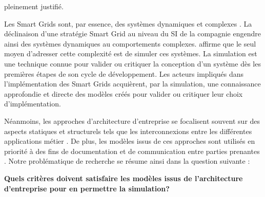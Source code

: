 pleinement justifié.

Les Smart Grids sont, par essence, des systèmes  dynamiques et complexes 
\cite{monti_power_2010}. La déclinaison d'une stratégie Smart Grid au niveau du 
SI de la compagnie engendre ainsi des systèmes dynamiques au comportements 
complexes. \cite{borshchev2004system} affirme que le seul moyen d'adresser cette 
complexité est  de simuler ces systèmes. La simulation est une technique connue 
pour valider ou critiquer la conception d'un système dès les premières étapes de 
son cycle de développement. Les acteurs impliqués dans l'implémentation des 
Smart Grids acquièrent, par la  simulation, une connaissance approfondie et 
directe des modèles créés pour valider ou critiquer leur choix d'implémentation.

Néanmoins, les approches d'architecture d'entreprise se focalisent souvent sur 
des aspects statiques et structurels tels que les interconnexions entre les 
différentes applications métier \cite{buckl2008towards}. De plus, les modèles 
issus de ces approches sont utilisés en priorité à des fins de documentation et 
de communication entre parties prenantes \cite{kulkarni2013modelling}. Notre 
problématique de recherche se résume ainsi dans la question suivante :

\textbf{Quels critères doivent satisfaire les modèles issus de l'architecture 
d'entreprise pour en permettre la simulation?}
     

